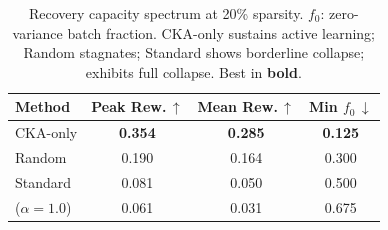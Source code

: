 \begin{table}[t]
\centering
\small
\caption{Recovery capacity spectrum at 20\% sparsity. $f_0$: zero-variance batch fraction. CKA-only sustains active learning; Random stagnates; Standard shows borderline collapse; \rasp{} exhibits full collapse. Best in \textbf{bold}.}
\label{tab:recovery_gradient}
\setlength{\tabcolsep}{5pt}
\begin{tabular}{@{}lccc@{}}
\toprule
Method & Peak Rew.\,$\uparrow$ & Mean Rew.\,$\uparrow$ & Min $f_0$\,$\downarrow$ \\
\midrule
CKA-only & \textbf{0.354} & \textbf{0.285} & \textbf{0.125} \\
Random & 0.190 & 0.164 & 0.300 \\
Standard & 0.081 & 0.050 & 0.500 \\
\rasp{} ($\alpha{=}1.0$) & 0.061 & 0.031 & 0.675 \\
\bottomrule
\end{tabular}
\end{table}
